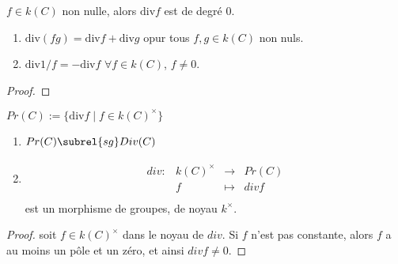         \begin{theo}
            $f \in k(C)$ non nulle, alors $\mathrm{div} f$ est de degré $0$.
        \end{theo}
        \begin{prop}
            \begin{enumerate}
                \item $\mathrm{div} (fg) = \mathrm{div} f + \mathrm{div} g$ opur tous $f,g \in k(C)$ non nuls.
                \item $\mathrm{div} 1/f = - \mathrm{div} f$ $\forall f \in k(C)$, $f \neq 0$.
            \end{enumerate}
        \end{prop}
        \begin{proof}
        \end{proof}
        \begin{defi}
            $Pr(C) := \{\mathrm{div} f \mid f \in k(C)^\times\}$
        \end{defi}
        \begin{prop}
            \begin{enumerate}
                \item $Pr(C) \subrel{sg} Div(C)$
                \item \begin{align*}
                    \begin{array}{cccc}
                        div : & k(C)^\times & \to & Pr(C) \\
                        & f & \mapsto & div f \\
                    \end{array}
                \end{align*}
                est un morphisme de groupes, de noyau $k^\times$.
            \end{enumerate}
        \end{prop}
        \begin{proof}
            soit $f \in k(C)^\times$ dans le noyau de $div$. Si $f$ n'est pas constante, alors $f$ a au moins un pôle et un zéro, et ainsi $div f \neq 0$.
        \end{proof}
